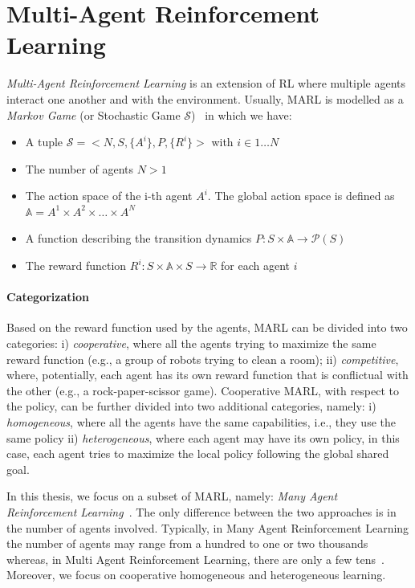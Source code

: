 \documentclass[12pt,a4paper,openright,twoside]{book}
\begin{document}
\section{Multi-Agent Reinforcement Learning}
\emph{Multi-Agent Reinforcement Learning} is an extension of RL where multiple agents interact one another and 
    with the environment. 
    Usually, MARL is modelled as a \emph{Markov Game} (or Stochastic Game $\mathcal{S}$)~\cite{LITTMAN1994157} in
    which we have:
    \begin{itemize}
        \item A tuple $\mathcal{S} = <N, S, \{A^i\}, P, \{R^i\}>$ with $i \in 1 \dots N$
        \item The number of agents $N > 1$
        \item The action space of the i-th agent $A^i$. The global action space is defined as $\mathbb{A} = A^1 \times A^2 \times \dots \times A^N$
        \item A function describing the transition dynamics $P: S \times \mathbb{A} \rightarrow \mathcal{P}(S)$
        \item The reward function $R^i: S \times \mathbb{A} \times S \rightarrow \mathbb{R}$ for each agent $i$ 
    \end{itemize}

\paragraph{Categorization}

Based on the reward function used by the agents, MARL can be divided into two categories: 
    i) \emph{cooperative}, where all the agents trying to maximize the same reward function (e.g., a group of robots
    trying to clean a room); 
    ii) \emph{competitive}, where, potentially, each agent has its own reward function that is conflictual with the other (e.g., a rock-paper-scissor game). 
    Cooperative MARL, with respect to the policy, can be further divided into two additional categories, namely: 
    i) \emph{homogeneous}, where all the agents have the same capabilities, i.e., they use the same policy 
    ii) \emph{heterogeneous}, where each agent may have its own policy, in this case, each agent tries to maximize the local policy following the global shared goal.

In this thesis, we focus on a subset of MARL, namely: \emph{Many Agent Reinforcement Learning}~\cite{yang2021many}. The only
    difference between the two approaches is in the number of agents involved. 
    Typically, in Many Agent Reinforcement Learning the number of agents may range from a hundred to one or two
    thousands whereas, in Multi Agent Reinforcement Learning, there are only a few tens~\cite{smac,marl-curricula}.
    Moreover, we focus on cooperative homogeneous and heterogeneous learning.
\end{document}
